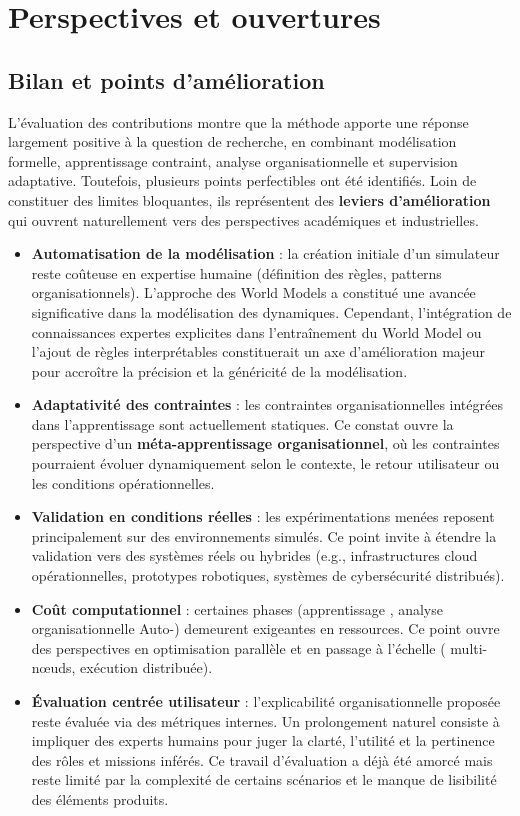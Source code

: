 \section*{Perspectives et ouvertures}
\label{sec:perspectives}

\subsection*{Bilan et points d'amélioration}

L'évaluation des contributions montre que la méthode  apporte une réponse largement positive à la question de recherche, en combinant modélisation formelle, apprentissage contraint, analyse organisationnelle et supervision adaptative.
Toutefois, plusieurs points perfectibles ont été identifiés. Loin de constituer des limites bloquantes, ils représentent des \textbf{leviers d'amélioration} qui ouvrent naturellement vers des perspectives académiques et industrielles.

\begin{itemize}
  \item \textbf{Automatisation de la modélisation} : la création initiale d'un simulateur reste coûteuse en expertise humaine (définition des règles, patterns organisationnels). L'approche des World Models a constitué une avancée significative dans la modélisation des dynamiques. Cependant, l'intégration de connaissances expertes explicites dans l'entraînement du World Model ou l'ajout de règles interprétables constituerait un axe d'amélioration majeur pour accroître la précision et la généricité de la modélisation.
  \item \textbf{Adaptativité des contraintes} : les contraintes organisationnelles intégrées dans l'apprentissage sont actuellement statiques. Ce constat ouvre la perspective d'un \textbf{méta-apprentissage organisationnel}, où les contraintes pourraient évoluer dynamiquement selon le contexte, le retour utilisateur ou les conditions opérationnelles.
  \item \textbf{Validation en conditions réelles} : les expérimentations menées reposent principalement sur des environnements simulés. Ce point invite à étendre la validation vers des systèmes réels ou hybrides (e.g., infrastructures cloud opérationnelles, prototypes robotiques, systèmes de cybersécurité distribués).
  \item \textbf{Coût computationnel} : certaines phases (apprentissage , analyse organisationnelle Auto-) demeurent exigeantes en ressources. Ce point ouvre des perspectives en optimisation parallèle et en passage à l'échelle ( multi-nœuds, exécution distribuée).
  \item \textbf{Évaluation centrée utilisateur} : l'explicabilité organisationnelle proposée reste évaluée via des métriques internes. Un prolongement naturel consiste à impliquer des experts humains pour juger la clarté, l'utilité et la pertinence des rôles et missions inférés. Ce travail d'évaluation a déjà été amorcé mais reste limité par la complexité de certains scénarios et le manque de lisibilité des éléments produits.
\end{itemize}


